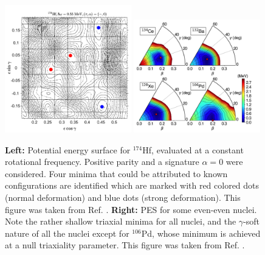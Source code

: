 \begin{figure}
    \centering
    \includegraphics[width=0.49\textwidth]{Chapters/Figures/174Hf-PES.pdf}
    \includegraphics[width=0.49\textwidth]{Chapters/Figures/even-A-PES.pdf}
    \caption{\textbf{Left:} Potential energy surface for $^{174}$Hf, evaluated at a constant rotational frequency. Positive parity and a signature $\alpha=0$ were considered. Four minima that could be attributed to known configurations are identified which are marked with red colored dots (normal deformation) and blue dots (strong deformation). This figure was taken from Ref. \cite{djongolov2003extending}. \textbf{Right:} PES for some even-even nuclei. Note the rather shallow triaxial minima for all nuclei, and the $\gamma$-soft nature of all the nuclei except for $^{106}$Pd, whose minimum is achieved at a null triaxiality parameter. This figure was taken from Ref. \cite{nomura2021examining}.}
    \label{pes-example-set-1}
\end{figure}

